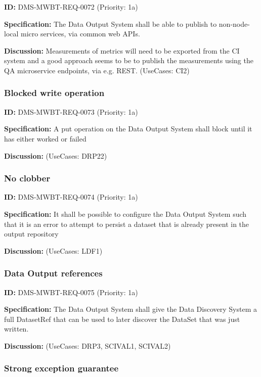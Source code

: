 \documentclass[SE,toc,lsstdraft]{lsstdoc}
\begin{document}
\label{DMS-MWBT-REQ-0072}
\textbf{ID:} DMS-MWBT-REQ-0072 (Priority: 1a)

\textbf{Specification:}
The Data Output System shall be able to publish to non-node-local micro services, via common web APIs.

\textbf{Discussion:}
Measurements of metrics will need to be exported from the CI system and a good approach seems to be to publish the measurements using the QA microservice endpoints, via e.g. REST. (UseCases: CI2)

\subsubsection{Blocked write operation}

\label{DMS-MWBT-REQ-0073}
\textbf{ID:} DMS-MWBT-REQ-0073 (Priority: 1a)

\textbf{Specification:}
A put operation on the Data Output System shall block until it has either worked or failed

\textbf{Discussion:}
(UseCases: DRP22)

\subsubsection{No clobber}

\label{DMS-MWBT-REQ-0074}
\textbf{ID:} DMS-MWBT-REQ-0074 (Priority: 1a)

\textbf{Specification:}
It shall be possible to configure the Data Output System such that it is an error to attempt to persist a dataset that is already present in the output repository

\textbf{Discussion:}
(UseCases: LDF1)

\subsubsection{Data Output references}

\label{DMS-MWBT-REQ-0075}
\textbf{ID:} DMS-MWBT-REQ-0075 (Priority: 1a)

\textbf{Specification:}
The Data Output System shall give the Data Discovery System a full DatasetRef that can be used to later discover the DataSet that was just written.

\textbf{Discussion:}
(UseCases: DRP3, SCIVAL1, SCIVAL2)

\subsubsection{Strong exception guarantee}
\end{document}
